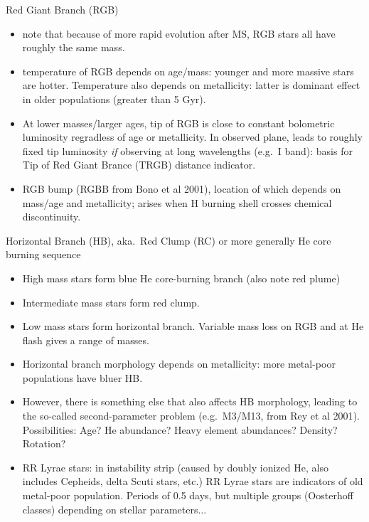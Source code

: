\documentclass{article}
\begin{document}
Red Giant Branch (RGB)
        \begin{itemize}
            \item note that because of more rapid evolution after MS,
                RGB stars all have roughly the same mass.
            \item temperature of RGB depends on age/mass: younger and more
                massive stars are hotter. Temperature also depends on
                metallicity: latter is dominant effect in older populations
                (greater than 5 Gyr).
            \item At lower masses/larger ages, tip of RGB is close to
                constant bolometric luminosity regradless of age or
                metallicity. In observed plane, leads to roughly fixed
                tip luminosity \emph{if} observing at long wavelengths
                (e.g.\ I band): basis for Tip of Red Giant Brance (TRGB)
                distance indicator.
            \item RGB bump (RGBB from
                Bono et al 2001),
                location of which depends on mass/age and metallicity;
                arises when H burning shell crosses chemical discontinuity.
        \end{itemize}
Horizontal Branch (HB), aka.\ Red Clump (RC) or more generally
        He core burning sequence
        \begin{itemize}
            \item High mass stars form blue He core-burning branch
                (also note red plume)
            \item Intermediate mass stars form red clump.
            \item Low mass stars form horizontal branch. Variable mass loss
                on RGB and at He flash gives a range of masses.
            \item Horizontal branch morphology depends on metallicity: more
                metal-poor populations have bluer HB.
            \item However, there is something else that also affects HB
                morphology, leading to the so-called second-parameter problem
                (e.g.\ {M3/M13}, from {Rey et al
                2001}). Possibilities: Age? He abundance? Heavy element
                abundances? Density? Rotation?
            \item RR Lyrae stars: in instability strip (caused by doubly
                ionized He, also includes Cepheids, delta Scuti stars, etc.)
                RR Lyrae stars are indicators of old metal-poor population.
                Periods of 0.5 days, but multiple groups (Oosterhoff classes)
                depending on stellar parameters$\ldots$
        \end{itemize}
\end{document}
